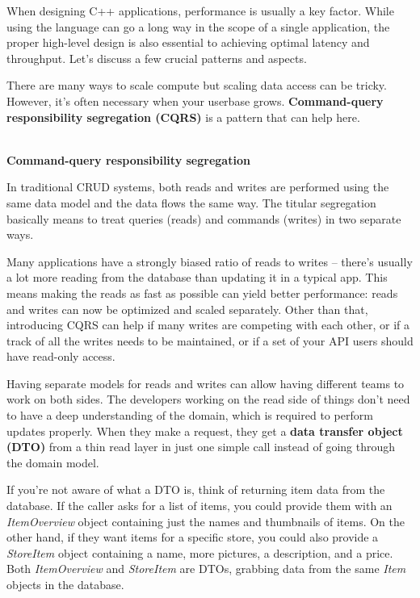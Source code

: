 
When designing C++ applications, performance is usually a key factor. While using the language can go a long way in the scope of a single application, the proper high-level design is also essential to achieving optimal latency and throughput. Let's discuss a few crucial patterns and aspects.


There are many ways to scale compute but scaling data access can be tricky. However, it's often necessary when your userbase grows. \textbf{Command-query responsibility segregation (CQRS)} is a pattern that can help here.


\hspace*{\fill} \\ %
\noindent
\textbf{Command-query responsibility segregation}

In traditional CRUD systems, both reads and writes are performed using the same data model and the data flows the same way. The titular segregation basically means to treat queries (reads) and commands (writes) in two separate ways.

Many applications have a strongly biased ratio of reads to writes – there's usually a lot more reading from the database than updating it in a typical app. This means making the reads as fast as possible can yield better performance: reads and writes can now be optimized and scaled separately. Other than that, introducing CQRS can help if many writes are competing with each other, or if a track of all the writes needs to be maintained, or if a set of your API users should have read-only access.

Having separate models for reads and writes can allow having different teams to work on both sides. The developers working on the read side of things don't need to have a deep understanding of the domain, which is required to perform updates properly. When they make a request, they get a \textbf{data transfer object (DTO)} from a thin read layer in just one simple call instead of going through the domain model.

If you're not aware of what a DTO is, think of returning item data from the database. If the caller asks for a list of items, you could provide them with an \textit{ItemOverview} object containing just the names and thumbnails of items. On the other hand, if they want items for a specific store, you could also provide a \textit{StoreItem} object containing a name, more pictures, a description, and a price. Both \textit{ItemOverview} and \textit{StoreItem} are DTOs, grabbing data from the same \textit{Item} objects in the database.

